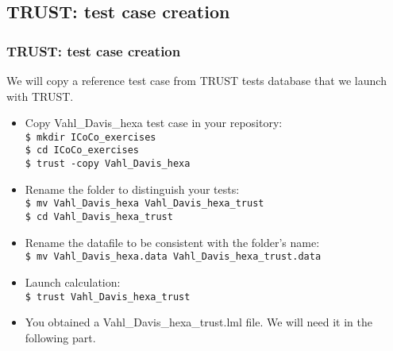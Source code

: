 \documentclass[10pt, hyperref={unicode=true,pdfusetitle, bookmarks=true,bookmarksnumbered=false,bookmarksopen=false, breaklinks=false,pdfborder={0 0 1},backref=true,colorlinks=true,linkcolor=darkblue,pageanchor, urlcolor=darkblue}]{beamer}
\begin{document}
\subsection{{\bf{TRUST: test case creation}}}
\begin{frame}
\end{frame}
\begin{frame}
\frametitle{TRUST: test case creation}
\begin{block}{}
We will copy a reference test case from TRUST tests database that we launch with TRUST. 

\begin{itemize}
\item Copy Vahl\_Davis\_hexa test case in your repository:\\
\texttt{\$ mkdir ICoCo\_exercises}\\
\texttt{\$ cd ICoCo\_exercises}\\
\texttt{\$ trust -copy Vahl\_Davis\_hexa}
\item Rename the folder to distinguish your tests:\\
\texttt{\$ mv Vahl\_Davis\_hexa Vahl\_Davis\_hexa\_trust}\\
\texttt{\$ cd Vahl\_Davis\_hexa\_trust}
\item Rename the datafile to be consistent with the folder's name:\\
\texttt{\$ mv Vahl\_Davis\_hexa.data Vahl\_Davis\_hexa\_trust.data}\\
\item Launch calculation:\\
\texttt{\$ trust Vahl\_Davis\_hexa\_trust}\\
\item You obtained a Vahl\_Davis\_hexa\_trust.lml file. We will need it in the following part.
\end{itemize}

\end{block}
\end{frame}
\end{document}
